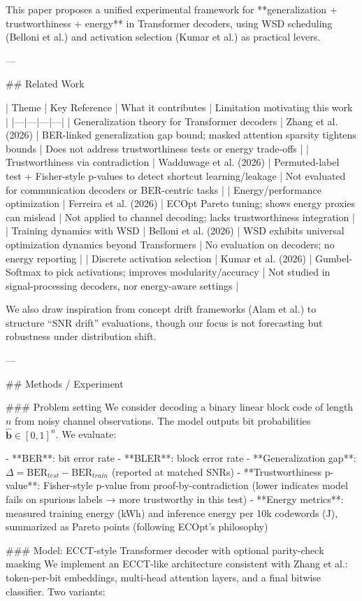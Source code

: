This paper proposes a unified experimental framework for **generalization + trustworthiness + energy** in Transformer decoders, using WSD scheduling (Belloni et al.) and activation selection (Kumar et al.) as practical levers.

---

## Related Work  

| Theme | Key Reference | What it contributes | Limitation motivating this work |
|---|---|---|---|
| Generalization theory for Transformer decoders | Zhang et al. (2026) | BER-linked generalization gap bound; masked attention sparsity tightens bounds | Does not address trustworthiness tests or energy trade-offs |
| Trustworthiness via contradiction | Wadduwage et al. (2026) | Permuted-label test + Fisher-style p-values to detect shortcut learning/leakage | Not evaluated for communication decoders or BER-centric tasks |
| Energy/performance optimization | Ferreira et al. (2026) | ECOpt Pareto tuning; shows energy proxies can mislead | Not applied to channel decoding; lacks trustworthiness integration |
| Training dynamics with WSD | Belloni et al. (2026) | WSD exhibits universal optimization dynamics beyond Transformers | No evaluation on decoders; no energy reporting |
| Discrete activation selection | Kumar et al. (2026) | Gumbel-Softmax to pick activations; improves modularity/accuracy | Not studied in signal-processing decoders, nor energy-aware settings |

We also draw inspiration from concept drift frameworks (Alam et al.) to structure “SNR drift” evaluations, though our focus is not forecasting but robustness under distribution shift.

---

## Methods / Experiment  

### Problem setting  
We consider decoding a binary linear block code of length \(n\) from noisy channel observations. The model outputs bit probabilities \(\hat{\mathbf{b}}\in[0,1]^n\). We evaluate:

- **BER**: bit error rate  
- **BLER**: block error rate  
- **Generalization gap**: \(\Delta = \text{BER}_{test}-\text{BER}_{train}\) (reported at matched SNRs)  
- **Trustworthiness p-value**: Fisher-style p-value from proof-by-contradiction (lower indicates model fails on spurious labels → more trustworthy in this test)  
- **Energy metrics**: measured training energy (kWh) and inference energy per 10k codewords (J), summarized as Pareto points (following ECOpt’s philosophy)

### Model: ECCT-style Transformer decoder with optional parity-check masking  
We implement an ECCT-like architecture consistent with Zhang et al.: token-per-bit embeddings, multi-head attention layers, and a final bitwise classifier. Two variants:

